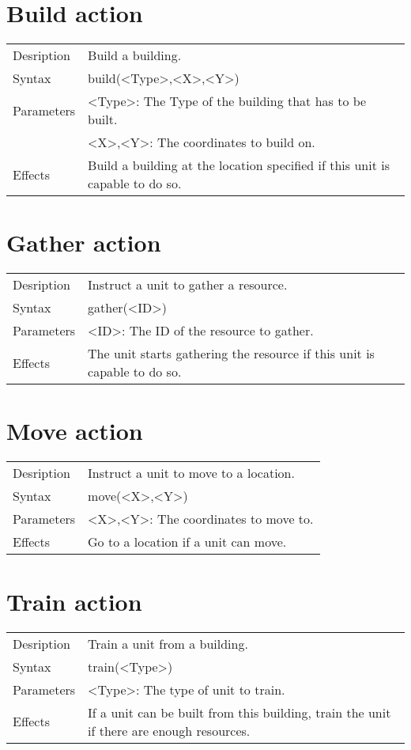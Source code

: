 \documentclass[english,11pt]{report}
\begin{document}
\section{Build action}
\begin{tabularx}{\textwidth}{lX}
 Desription & Build a building. \\
 Syntax & build(<Type>,<X>,<Y>) \\
 Parameters & <Type>: The Type of the building that has to be built.\\
            & <X>,<Y>: The coordinates to build on.\\
 Effects &  Build a building at the location specified if this unit is capable to do so.
\end{tabularx}

\section{Gather action}
\begin{tabularx}{\textwidth}{lX}
 Desription & Instruct a unit to gather a resource. \\
 Syntax & gather(<ID>) \\
 Parameters & <ID>: The ID of the resource to gather.\\
 Effects &  The unit starts gathering the resource if this unit is capable to do so.
\end{tabularx}

\section{Move action}
\begin{tabularx}{\textwidth}{lX}
 Desription & Instruct a unit to move to a location. \\
 Syntax & move(<X>,<Y>) \\
 Parameters & <X>,<Y>: The coordinates to move to.\\
 Effects &  Go to a location if a unit can move.
\end{tabularx}

\section{Train action}
\begin{tabularx}{\textwidth}{lX}
 Desription & Train a unit from a building. \\
 Syntax & train(<Type>) \\
 Parameters & <Type>: The type of unit to train.\\
 Effects &  If a unit can be built from this building, train the unit if there are enough resources.
\end{tabularx}
\end{document}
